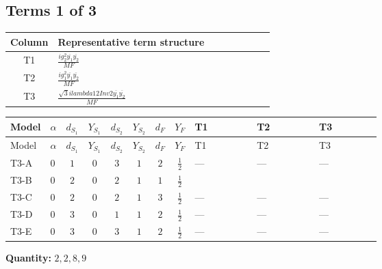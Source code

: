 \documentclass[8pt]{article}
\begin{document}
\begin{landscape}
\subsection*{Terms 1 of 3}
\begin{center}
\begin{tabular}{@{}c >{\raggedright\arraybackslash}p{0.82\linewidth}@{}}
\toprule
Column & Representative term structure \\
\midrule
T1 & \(\displaystyle \frac{i g_{2}^{2} \overline{y_{1}} \overline{y_{2}}}{MF}\) \\
\midrule
T2 & \(\displaystyle \frac{i g_{1}^{2} \overline{y_{1}} \overline{y_{2}}}{MF}\) \\
\midrule
T3 & \(\displaystyle \frac{\sqrt{3} i lambda12Inv2 \overline{y_{1}} \overline{y_{2}}}{MF}\) \\
\midrule
\bottomrule
\end{tabular}
\end{center}
\smallskip
\tiny
\begin{longtable}{@{}llcccccc >{\raggedright\arraybackslash}p{0.21\linewidth} >{\raggedright\arraybackslash}p{0.21\linewidth} >{\raggedright\arraybackslash}p{0.21\linewidth}@{}}
\toprule
Model & $\alpha$ & $d_{S_1}$ & $Y_{S_1}$ & $d_{S_2}$ & $Y_{S_2}$ & $d_F$ & $Y_F$ & T1 & T2 & T3 \\
\midrule
\endfirsthead
\toprule
Model & $\alpha$ & $d_{S_1}$ & $Y_{S_1}$ & $d_{S_2}$ & $Y_{S_2}$ & $d_F$ & $Y_F$ & T1 & T2 & T3 \\
\midrule
\endhead
T3-A & $0$ & $1$ & $0$ & $3$ & $1$ & $2$ & $\frac{1}{2}$ & --- & --- & --- \\
\midrule
T3-B & $0$ & $2$ & $0$ & $2$ & $1$ & $1$ & $\frac{1}{2}$ & \scriptsize\adjustbox{max width=\linewidth}{$\begin{gathered} - \frac{3 i g_{2}^{2} \overline{y_{1}} \overline{y_{2}}}{4 MF}\end{gathered}$} & \scriptsize\adjustbox{max width=\linewidth}{$\begin{gathered} - \frac{3 i g_{1}^{2} \overline{y_{1}} \overline{y_{2}}}{8 MF}\end{gathered}$} & \scriptsize\adjustbox{max width=\linewidth}{$\begin{gathered} - \frac{\sqrt{3} i lambda12Inv2 \overline{y_{1}} \overline{y_{2}}}{3 MF}\end{gathered}$} \\
\midrule
T3-C & $0$ & $2$ & $0$ & $2$ & $1$ & $3$ & $\frac{1}{2}$ & --- & --- & --- \\
\midrule
T3-D & $0$ & $3$ & $0$ & $1$ & $1$ & $2$ & $\frac{1}{2}$ & --- & --- & --- \\
\midrule
T3-E & $0$ & $3$ & $0$ & $3$ & $1$ & $2$ & $\frac{1}{2}$ & --- & --- & --- \\
\midrule
\bottomrule
\end{longtable}
\clearpage
\noindent\textbf{Quantity: }$\mathrm{2,2,8,9}$\par\smallskip

\end{landscape}
\end{document}
